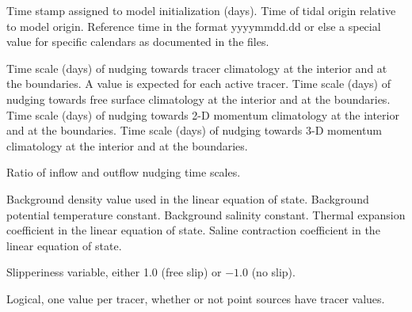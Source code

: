 \begin{klist}
    \mbox{}
     \begin{klist}
          Time stamp assigned to model initialization
     (days).
          Time of tidal origin relative to model
       origin.
         Reference time in the format yyyymmdd.dd or
       else a special value for specific calendars as documented in the
        files.
     \end{klist}
   \mbox{}
     \begin{klist}
           Time scale (days) of nudging towards
     tracer climatology at the interior and at the boundaries.
     A value is expected for each active tracer.
           Time scale (days) of nudging towards
     free surface climatology at the interior and at the boundaries.
           Time scale (days) of nudging towards
     2-D momentum climatology at the interior and at the boundaries.
           Time scale (days) of nudging towards
     3-D momentum climatology at the interior and at the boundaries.
     \end{klist}
    \mbox{}
     \begin{klist}
          Ratio of inflow and outflow nudging time scales.
     \end{klist}
    \mbox{}
     \begin{klist}
              Background density value used in
    the linear equation of state.
              Background potential temperature constant.
              Background salinity constant.
           Thermal expansion coefficient in the linear
    equation of state.
           Saline contraction coefficient in the linear
    equation of state.
     \end{klist}
    \mbox{}
     \begin{klist}
          Slipperiness variable, either 1.0 (free
     slip) or $-1.0$ (no slip).
     \end{klist}
    \mbox{}
     \begin{klist}
        Logical, one value per tracer,
whether or not point sources have tracer values.
     \end{klist}

\end{klist}

